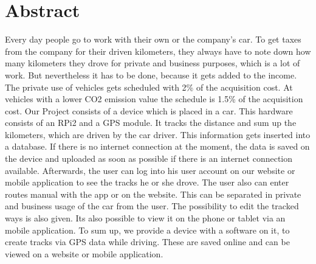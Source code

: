 \chapter*{Abstract}
Every day people go to work with their own or the company's car. To get taxes from the company for their driven kilometers, they always have to note down how many kilometers they drove for private and business purposes, which is a lot of work. But nevertheless it has to be done, because it gets added to the income. The private use of vehicles gets scheduled with 2\% of the acquisition cost. At vehicles with a lower CO2 emission value the schedule is 1.5\% of the acquisition cost.
\newline \newline
Our Project consists of a device which is placed in a car. This hardware consists of an RPi2 and a GPS module. It tracks the distance and sum up the kilometers, which are driven by the car driver. This information gets inserted into a database. If there is no internet connection at the moment, the data is saved on the device and uploaded as soon as possible if there is an internet connection available. Afterwards, the user can log into his user account on our website or mobile application to see the tracks he or she drove. The user also can enter routes manual with the app or on the website. This can be separated in private and business usage of the car from the user. The possibility to edit the tracked ways is also given. Its also possible to view it on the phone or tablet via an mobile application.
\newline \newline
To sum up, we provide a device with a software on it, to create tracks via GPS data while driving. These are saved online and can be viewed on a website or mobile application.